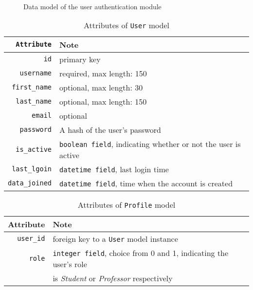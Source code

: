 \begin{figure}[ht]
    \centering
    \caption{Data model of the user authentication module}
    \usetikzlibrary{er}

\end{figure}


\begin{table}[ht]
    \centering
    \caption{Attributes of \texttt{User} model}
    \renewcommand{\arraystretch}{1.5}
    \begin{tabular}[ht]{r|l}
        \hline
        \texttt{Attribute} & Note \\
        \hline
        \hline
        \texttt{id} & primary key \\
        \hline
        \texttt{username} &  required, max length: 150 \\
        \hline
        \texttt{first\_name} &  optional, max length: 30 \\
        \hline
        \texttt{last\_name} &  optional, max length: 150 \\
        \hline
        \texttt{email} & optional\\
        \hline
        \texttt{password} & A hash of the user's password \\
        \hline
        \texttt{is\_active} & \texttt{boolean field}, indicating whether or not the user
            is active \\
        \hline
        \texttt{last\_lgoin} & \texttt{datetime field}, last login time \\
        \hline
        \texttt{data\_joined} & \texttt{datetime field}, time when the account is created \\
        \hline
    \end{tabular}
    \renewcommand{\arraystretch}{1}
\end{table}

\begin{table}[ht]
    \centering
    \caption{Attributes of \texttt{Profile} model}
    \renewcommand{\arraystretch}{1.5}
    \begin{tabular}[ht]{r|l}
        \hline
        Attribute & Note \\
        \hline
        \hline
        \texttt{user\_id} & foreign key to a \texttt{User} model instance \\
        \hline
        \texttt{role} & \texttt{integer field}, choice from 0 and 1, indicating the
            user's role \\
           & is \emph{Student} or \emph{Professor} respectively \\
        \hline
    \end{tabular}
    \renewcommand{\arraystretch}{1}
\end{table}




